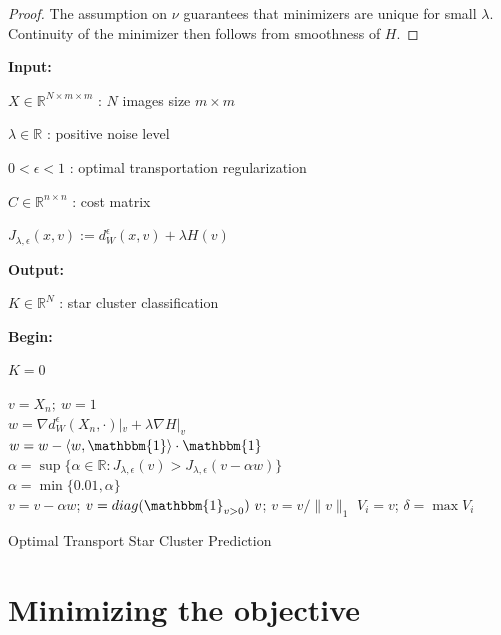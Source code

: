 \documentclass[conference]{IEEEtran}
\newcommand{\R}{{\mathbb{R}}}
\newcommand{\bbI}{{\mathbbm{1}}}
\begin{document}
\begin{proof}
    The assumption on $\nu$ guarantees that minimizers are unique for small $\lambda$. Continuity of the minimizer then follows from smoothness of $H$. 
\end{proof}

\begin{algorithm}[h]
    \textbf{Input:} 
    
    \quad $X \in \R^{N \times m \times m}$ : $N$ images size $m \times m$

    \quad $\lambda \in \R$ : positive noise level 

    \quad $0 < \epsilon < 1$ : optimal transportation regularization 

    \quad $C\in\R^{n \times n}$ : cost matrix 

    \quad $ J_{\lambda,\epsilon}(x,v) := d_W^\epsilon(x,v) + \lambda H(v) $

    \textbf{Output:}
    
    \quad $K \in \R^N$ : star cluster classification
    
    \textbf{Begin:}
    
    $K = 0$
    
 	{
        $ v = X_n;\ w = 1 $ \\
 	    {
$w = \nabla d_W^\epsilon(X_n,\cdot)|_v + \lambda \nabla H|_v $ \\
$ w = w - \langle w, \bbI \rangle \cdot \bbI $ \\
$ \alpha = \sup\{\alpha \in \R : J_{\lambda,\epsilon}(v) > J_{\lambda,\epsilon}(v - \alpha w) \}$ \\
            $ \alpha = \min\{0.01, \alpha\}$\\
 	        $ v = v - \alpha w $;
 	        $ v = diag(\bbI_{v > 0}) \ v $;
 	        $ v = v/\|v\|_1 $
 	    }
 	    $V_i = v$;
     	$\delta = \max V_i$
     	
  	}
	\caption{Optimal Transport Star Cluster Prediction}
	\label{algo:OT}
\end{algorithm}

\section{Minimizing the objective}
\end{document}
